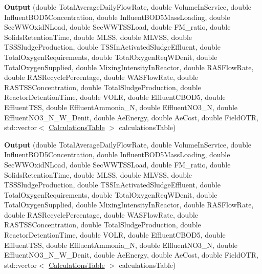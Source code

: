 \begin{DoxyCompactItemize}
{\bfseries Output} (double Total\+Average\+Daily\+Flow\+Rate, double Volume\+In\+Service, double Influent\+B\+O\+D5\+Concentration, double Influent\+B\+O\+D5\+Mass\+Loading, double Sec\+W\+W\+Oxid\+N\+Load, double Sec\+W\+W\+T\+S\+S\+Load, double F\+M\+\_\+ratio, double Solids\+Retention\+Time, double M\+L\+SS, double M\+L\+V\+SS, double T\+S\+S\+Sludge\+Production, double T\+S\+S\+In\+Activated\+Sludge\+Effluent, double Total\+Oxygen\+Requirements, double Total\+Oxygen\+Req\+W\+Denit, double Total\+Oxygen\+Supplied, double Mixing\+Intensity\+In\+Reactor, double R\+A\+S\+Flow\+Rate, double R\+A\+S\+Recycle\+Percentage, double W\+A\+S\+Flow\+Rate, double R\+A\+S\+T\+S\+S\+Concentration, double Total\+Sludge\+Production, double Reactor\+Detention\+Time, double V\+O\+LR, double Effluent\+C\+B\+O\+D5, double Effluent\+T\+SS, double Effluent\+Ammonia\+\_\+N, double Effluent\+N\+O3\+\_\+N, double Effluent\+N\+O3\+\_\+\+N\+\_\+\+W\+\_\+\+Denit, double Ae\+Energy, double Ae\+Cost, double Field\+O\+TR, std\+::vector$<$ \hyperlink{struct_waste_water___treatment_1_1_calculations_table}{Calculations\+Table} $>$ calculations\+Table)
\item 
\mbox{\label{struct_waste_water___treatment_1_1_output_aa52bc41b8aa3d144c7d9ef5de40e1468}} 
{\bfseries Output} (double Total\+Average\+Daily\+Flow\+Rate, double Volume\+In\+Service, double Influent\+B\+O\+D5\+Concentration, double Influent\+B\+O\+D5\+Mass\+Loading, double Sec\+W\+W\+Oxid\+N\+Load, double Sec\+W\+W\+T\+S\+S\+Load, double F\+M\+\_\+ratio, double Solids\+Retention\+Time, double M\+L\+SS, double M\+L\+V\+SS, double T\+S\+S\+Sludge\+Production, double T\+S\+S\+In\+Activated\+Sludge\+Effluent, double Total\+Oxygen\+Requirements, double Total\+Oxygen\+Req\+W\+Denit, double Total\+Oxygen\+Supplied, double Mixing\+Intensity\+In\+Reactor, double R\+A\+S\+Flow\+Rate, double R\+A\+S\+Recycle\+Percentage, double W\+A\+S\+Flow\+Rate, double R\+A\+S\+T\+S\+S\+Concentration, double Total\+Sludge\+Production, double Reactor\+Detention\+Time, double V\+O\+LR, double Effluent\+C\+B\+O\+D5, double Effluent\+T\+SS, double Effluent\+Ammonia\+\_\+N, double Effluent\+N\+O3\+\_\+N, double Effluent\+N\+O3\+\_\+\+N\+\_\+\+W\+\_\+\+Denit, double Ae\+Energy, double Ae\+Cost, double Field\+O\+TR, std\+::vector$<$ \hyperlink{struct_waste_water___treatment_1_1_calculations_table}{Calculations\+Table} $>$ calculations\+Table)
\end{DoxyCompactItemize}
